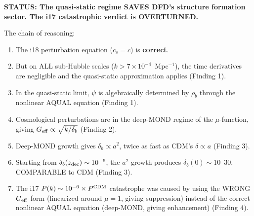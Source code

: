 \documentclass[11pt]{article}
\newcommand{\ee}[1]{\times 10^{#1}}
\newcommand{\Geff}{G_{\rm eff}}
\begin{document}
\begin{tcolorbox}[colback=green!5!white, colframe=green!70!black,
  title=\textbf{EXISTENTIAL ASSESSMENT --- UPGRADED FROM ``SERIOUS'' TO ``VIABLE''}]

\textbf{STATUS: The quasi-static regime SAVES DFD's structure formation
sector. The i17 catastrophic verdict is OVERTURNED.}

The chain of reasoning:
\begin{enumerate}
\item The i18 perturbation equation ($c_s = c$) is \textbf{correct}.
\item But on ALL sub-Hubble scales ($k > 7\ee{-4}$~Mpc$^{-1}$), the
  time derivatives are negligible and the quasi-static approximation
  applies (Finding 1).
\item In the quasi-static limit, $\psi$ is algebraically determined by
  $\rho_b$ through the nonlinear AQUAL equation (Finding 1).
\item Cosmological perturbations are in the deep-MOND regime of the
  $\mu$-function, giving $\Geff \propto \sqrt{k/\delta_b}$ (Finding 2).
\item Deep-MOND growth gives $\delta_b \propto a^2$, twice as fast as
  CDM's $\delta \propto a$ (Finding 3).
\item Starting from $\delta_b(z_{\rm dec}) \sim 10^{-5}$, the $a^2$
  growth produces $\delta_b(0) \sim 10$--$30$, COMPARABLE to CDM
  (Finding 3).
\item The i17 $P(k) \sim 10^{-6}\times P^{\rm CDM}$ catastrophe was
  caused by using the WRONG $\Geff$ form (linearized around
  $\mu = 1$, giving suppression) instead of the correct nonlinear
  AQUAL equation (deep-MOND, giving enhancement) (Finding 4).
\end{enumerate}


\end{tcolorbox}
\end{document}
